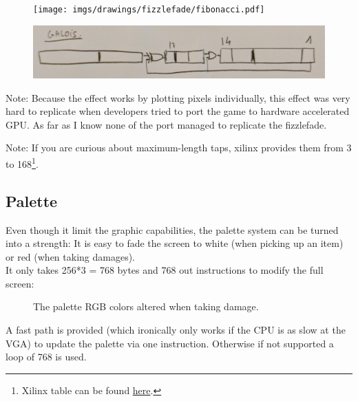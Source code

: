 \par
\begin{minipage}{\textwidth}

\end{minipage}
\par

\begin{figure}[H] \centering \texttt{[image: imgs/drawings/fizzlefade/fibonacci.pdf]} \end{figure}
\begin{figure}[H] \centering \includegraphics[width=\textwidth]{imgs/drawings/fizzlefade/galois.png} \end{figure}
      
Note: Because the effect works by plotting pixels individually, this effect was very hard to replicate when developers tried to port the game to hardware accelerated GPU. As far as I know none of the port managed to replicate the fizzlefade.

Note: If you are curious about maximum-length taps, xilinx provides them from 3 to 168\footnote{Xilinx table can be found \href{http://www.xilinx.com/support/documentation/application\_notes/xapp052.pdf}{here}.}.










\subsection{Palette}
Even though it limit the graphic capabilities, the palette system can be turned into a strength: It is easy to fade the screen to white (when picking up an item) or red (when taking damages).\\
It only takes 256*3 = 768 bytes and 768 out instructions to modify the full screen:
\begin{figure}[H]
  \centering
 \caption{The palette RGB colors altered when taking damage.} \label{fig:palette_damage}
\end{figure}
A fast path is provided (which ironically only works if the CPU is as slow at the VGA) to update the palette via one  instruction. Otherwise if not supported a loop of 768  is used.
\begin{minipage}{\linewidth}

\end{minipage}








